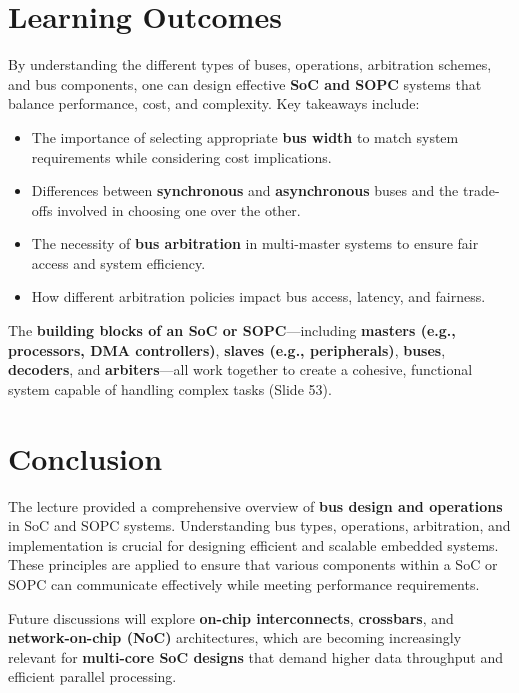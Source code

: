 \documentclass[
  14pt,
  a4paper,
  numbers=noendperiod,
  headinclude=true,
  footinclude=true,
  DIV=calc]{scrreprt}
\begin{document}
\section{Learning Outcomes}\label{learning-outcomes}

By understanding the different types of buses, operations, arbitration
schemes, and bus components, one can design effective \textbf{SoC and
SOPC} systems that balance performance, cost, and complexity. Key
takeaways include:

\begin{itemize}
\item
  The importance of selecting appropriate \textbf{bus width} to match
  system requirements while considering cost implications.
\item
  Differences between \textbf{synchronous} and \textbf{asynchronous}
  buses and the trade-offs involved in choosing one over the other.
\item
  The necessity of \textbf{bus arbitration} in multi-master systems to
  ensure fair access and system efficiency.
\item
  How different arbitration policies impact bus access, latency, and
  fairness.
\end{itemize}

The \textbf{building blocks of an SoC or SOPC}---including
\textbf{masters (e.g., processors, DMA controllers)}, \textbf{slaves
(e.g., peripherals)}, \textbf{buses}, \textbf{decoders}, and
\textbf{arbiters}---all work together to create a cohesive, functional
system capable of handling complex tasks (Slide 53).

\section{Conclusion}\label{conclusion-4}

The lecture provided a comprehensive overview of \textbf{bus design and
operations} in SoC and SOPC systems. Understanding bus types,
operations, arbitration, and implementation is crucial for designing
efficient and scalable embedded systems. These principles are applied to
ensure that various components within a SoC or SOPC can communicate
effectively while meeting performance requirements.

Future discussions will explore \textbf{on-chip interconnects},
\textbf{crossbars}, and \textbf{network-on-chip (NoC)} architectures,
which are becoming increasingly relevant for \textbf{multi-core SoC
designs} that demand higher data throughput and efficient parallel
processing.
\end{document}
